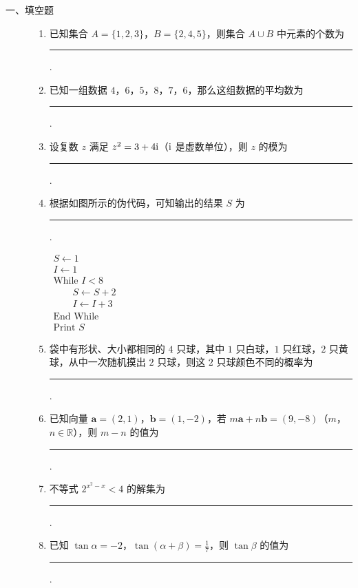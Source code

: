 \begin{description}

    \item[一、填空题]

    \begin{enumerate}[leftmargin=5pt]

        \item 已知集合 \(A = \{1, 2, 3\}\)，\(B = \{2, 4, 5\}\)，则集合 \(A \cup B\) 中元素的个数为\rule[-0.3ex]{3em}{0.4pt}.

        \item 已知一组数据 \(4\)，\(6\)，\(5\)，\(8\)，\(7\)，\(6\)，那么这组数据的平均数为\rule[-0.3ex]{3em}{0.4pt}.

        \item 设复数 \(z\) 满足 \(z^{2}=3+4\mathrm{i}\)（\(\mathrm{i}\) 是虚数单位），则 \(z\) 的模为\rule[-0.3ex]{3em}{0.4pt}.

        \item 根据如图所示的伪代码，可知输出的结果 \(S\) 为\rule[-0.3ex]{3em}{0.4pt}.

\begin{center}
\(\begin{gathered}
S \leftarrow 1 \\
I \leftarrow 1 \\
\text{While } I<8 \\
\qquad S \leftarrow S+2 \\
\qquad I \leftarrow I+3 \\
\text{End While} \\
\text{Print } S
\end{gathered}\)
\end{center}

        \item 袋中有形状、大小都相同的 \(4\) 只球，其中 \(1\) 只白球，\(1\) 只红球，\(2\) 只黄球，从中一次随机摸出 \(2\) 只球，则这 \(2\) 只球颜色不同的概率为\rule[-0.3ex]{3em}{0.4pt}.

        \item 已知向量 \(\bm{a} = (2, 1)\)，\(\bm{b} = (1, -2)\)，若 \(m\bm{a} + n\bm{b} = (9, -8)\)（\(m\)，\(n \in \mathbb{R}\)），则 \(m - n\) 的值为\rule[-0.3ex]{3em}{0.4pt}.

        \item 不等式 \(2^{x^2 - x} < 4\) 的解集为\rule[-0.3ex]{3em}{0.4pt}.

        \item 已知 \(\tan \alpha = -2\)，\(\tan (\alpha + \beta) = \frac{1}{7}\)，则 \(\tan \beta\) 的值为\rule[-0.3ex]{3em}{0.4pt}.


\end{enumerate}
\end{description}
